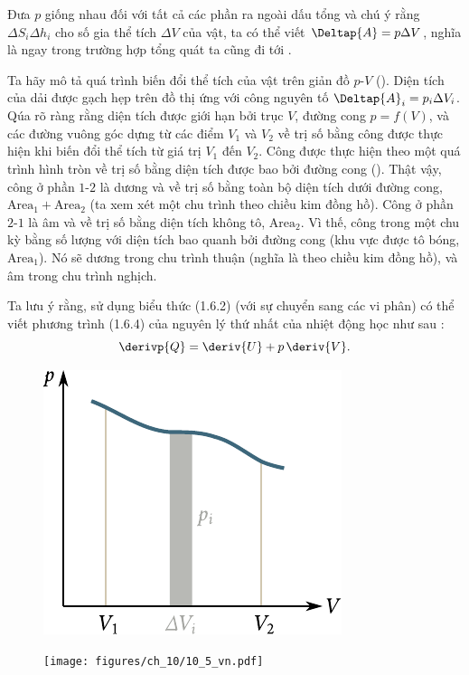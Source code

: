 \noindent
Đưa $p$ giống nhau đối với tất cả các phần ra ngoài dấu tổng và chú ý rằng $\Delta S_i\Delta h_i$ cho số gia thể tích $\Delta V$ của vật, ta có thể viết $\Deltap{A}=p\Delta V$, nghĩa là ngay trong trường hợp tổng quát ta cũng đi tới .

Ta hãy mô tả quá trình biến đổi thể tích của vật trên giản đồ $p$-$V$ (). Diện tích của dải được gạch hẹp trên đồ thị ứng với công nguyên tố $\Deltap{A}_i=p_i\Delta V_i$. Qúa rõ ràng rằng diện tích được giới hạn bởi trục $V$, đường cong $p=f(V)$, và các đường vuông góc dựng từ các điểm $V_1$ và $V_2$ về trị số bằng công được thực hiện khi biến đổi thể tích từ giá trị $V_1$ đến $V_2$. Công được thực hiện theo một quá trình hình tròn về trị số bằng diện tích được bao bởi đường cong (). Thật vậy, công ở phần $1$-$2$ là dương và về trị số bằng toàn bộ diện tích dưới đường cong, $\text{Area}_1+\text{Area}_2$ (ta xem xét một chu trình theo chiều kim đồng hồ). Công ở phần $2$-$1$ là âm và về trị số bằng diện tích không tô, $\text{Area}_2$. Vì thế, công trong một chu kỳ bằng số lượng với diện tích bao quanh bởi đường cong (khu vực được tô bóng, $\text{Area}_1$). Nó sẽ dương trong chu trình thuận (nghĩa là theo chiều kim đồng hồ), và âm trong chu trình nghịch.

Ta lưu ý rằng, sử dụng biểu thức (1.6.2) (với sự chuyển sang các vi phân) có thể viết phương trình (1.6.4) của nguyên lý thứ nhất của nhiệt động học như sau :
\begin{equation}\label{eq:10_13}
	\derivp{Q} = \deriv{U} + p\,\deriv{V}.
\end{equation}

\begin{figure}[!htb]
	\begin{minipage}[t]{0.5\linewidth}
		\begin{center}
			\includegraphics[scale=1.0]{figures/ch_10/fig_10_4.pdf}
			\caption[]{}
			\label{fig:10_4}
		\end{center}
	\end{minipage}
	\hspace{-0.0cm}
	\begin{minipage}[t]{0.5\linewidth}
		\begin{center}
			\texttt{[image: figures/ch\_10/10\_5\_vn.pdf]}
			\caption[]{}
			\label{fig:10_5}
		\end{center}
	\end{minipage}
\end{figure}


